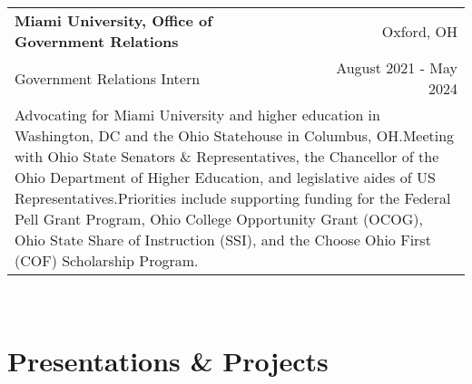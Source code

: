 \documentclass[letterpaper,8pt]{article} %
\begin{document}
{\begin{tabular*}{\linewidth}{@{\extracolsep{\fill}} lr }
\textbf{Miami University, Office of Government Relations} & \footnotesize{Oxford, OH}\\
\footnotesize{Government Relations Intern} & \footnotesize{August 2021 - May 2024}\\
\multicolumn{2}{p{\linewidth}}{\footnotesize{Advocating for Miami University and higher education in Washington, DC and the Ohio Statehouse in Columbus, OH.\@ Meeting with Ohio State Senators \& Representatives, the Chancellor of the Ohio Department of Higher Education, and legislative aides of US Representatives.\@ Priorities include supporting funding for the Federal Pell Grant Program, Ohio College Opportunity Grant (OCOG), Ohio State Share of Instruction (SSI), and the Choose Ohio First (COF) Scholarship Program.}}\\


\end{tabular*}}\\


\section{Presentations \& Projects}
\end{document}
